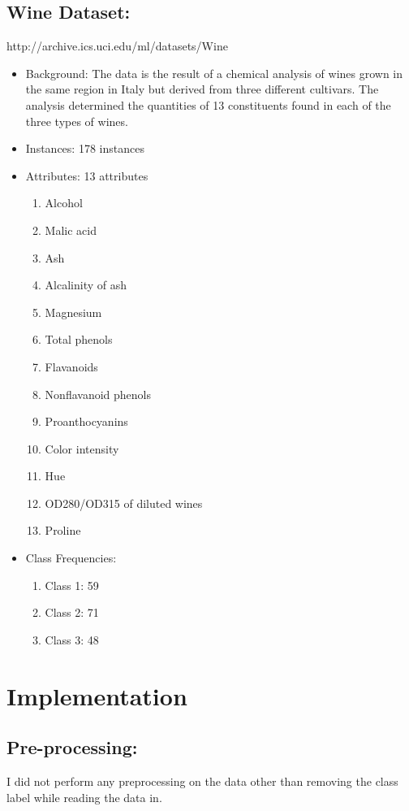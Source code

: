 \documentclass{article}
\begin{document}
\subsection{Wine Dataset:}
http://archive.ics.uci.edu/ml/datasets/Wine
\begin{itemize}
\item Background: The data is the result of a chemical analysis of wines grown in the same region in Italy but derived from three different cultivars. The analysis determined the quantities of 13 constituents found in each of the three types of wines.
\item Instances: 178 instances 
\item Attributes: 13 attributes
\begin{enumerate}
    \item Alcohol
    \item Malic acid
    \item Ash
    \item Alcalinity of ash
    \item Magnesium
    \item Total phenols
    \item Flavanoids
    \item Nonflavanoid phenols
    \item Proanthocyanins
    \item Color intensity
    \item Hue
    \item OD280/OD315 of diluted wines
    \item Proline
\end{enumerate}
\item Class Frequencies: 
\begin{enumerate}
    \item Class 1: 59
    \item Class 2: 71
    \item Class 3: 48
\end{enumerate}
\end{itemize}

\section{Implementation}
\subsection{Pre-processing:}
I did not perform any preprocessing on the data other than removing the class label while reading the data in. 
\end{document}
